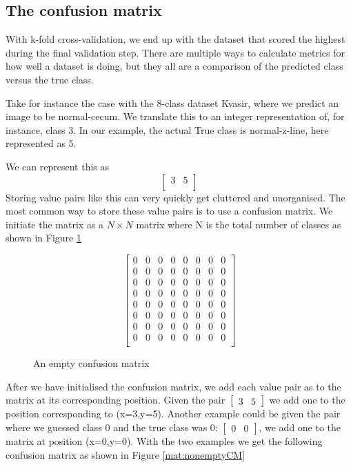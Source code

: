 \subsection{The confusion matrix}
With k-fold cross-validation, we end up with the dataset that scored the highest during the final validation step.  There are multiple ways to calculate metrics for how well a dataset is doing,  but they all are a comparison of the predicted class versus the true class.  

Take for instance the case with the 8-class dataset Kvasir, where we predict an image to be normal-cecum. We translate this to an integer representation of, for instance, class 3. In our example, the actual True class is normal-z-line, here represented as 5. 

We can represent this as 
\[
\begin{bmatrix}
 3 & 5\\ 
\end{bmatrix}
\]
Storing value pairs like this can very quickly get cluttered and unorganised.
The most common way to store these value pairs is to use a confusion matrix.  We initiate the matrix as a \textit{$N \times N$} matrix where N is the total number of classes as shown in Figure \ref{mat:emptyCM}

\begin{figure}[h]
    \myfontsize
    \centering
    \[
    \begin{bmatrix}
     0 & 0 &  0 &  0 &  0 &  0 &  0 &  0\\
     0 & 0 &  0 &  0 &  0 &  0 &  0 &  0\\
     0 & 0 &  0 &  0 &  0 &  0 &  0 &  0\\
     0 & 0 &  0 &  0 &  0 &  0 &  0 &  0\\
     0 & 0 &  0 &  0 &  0 &  0 &  0 &  0\\
     0 & 0 &  0 &  0 &  0 &  0 &  0 &  0\\
     0 & 0 &  0 &  0 &  0 &  0 &  0 &  0\\
     0 & 0 &  0 &  0 &  0 &  0 &  0 &  0\\
    \end{bmatrix}
    \]
    \caption{An empty confusion matrix}
    \label{mat:emptyCM}
\end{figure}



After we have initialised the confusion matrix, we add each value pair as to the matrix at its corresponding position.  
Given the pair $\begin{bmatrix} 3 & 5 \end{bmatrix}$ we add one to the position corresponding to (x=3,y=5). 
Another example could be given the pair where we guessed class 0 and the true class was 0:  $\begin{bmatrix}  0 & 0 \end{bmatrix}$, we add one to the matrix at position (x=0,y=0). With the two examples we get the following confusion matrix as shown in Figure \ref{mat:nonemptyCM}

